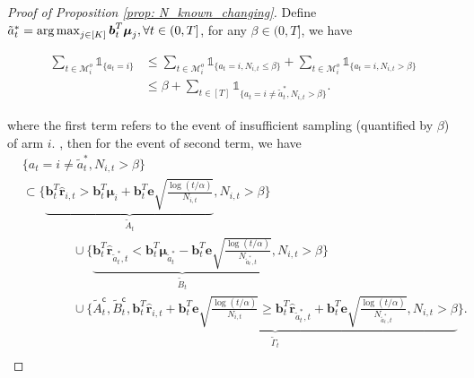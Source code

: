 \begin{proof}[Proof of Proposition \ref{prop: N_known_changing}]

Define $\tilde{a}_{t}^{*} = \operatorname*{arg\,max}_{j \in [K]} \boldsymbol{b}_t^T \boldsymbol{\mu}_j, \forall t \in (0,T]$, for any $\beta \in (0, T]$, we have

\begin{equation}
\begin{aligned}
\label{eq: term_1_stat}
\sum_{t \in \mathcal{M}^{o}_i} \mathds{1}_{\{a_t = i \} }
& \leq 
\sum_{t \in \mathcal{M}^{o}_i} \mathds{1}_{\{a_t = i, N_{i,t} \leq \beta \}}
+
\sum_{t \in \mathcal{M}^{o}_i} \mathds{1}_{\{a_t = i, N_{i,t} > \beta \}} \\
& \leq 
\beta
+
\sum_{t \in [T]} \mathds{1}_{\{a_t = i \neq \tilde{a}_{t}^{*}, N_{i,t} > \beta \}}.
\end{aligned}
\end{equation}



where the first term refers to the event of insufficient sampling (quantified by $\beta$) of arm $i$. 
, then for the event of second term, we have 
\begin{equation}
\begin{aligned}
\label{eq: event_ABC_t_stat1}
&{\{a_t = i \neq \tilde{a}_{t}^{*}, N_{i,t} > \beta \}} \\
& \subset
\Bigg\{ 
\underbrace{
\boldsymbol{b}_{t}^{T} \hat{\boldsymbol{r}}_{i,t} > \boldsymbol{b}_{t}^{T} \boldsymbol{\mu}_{i} + \boldsymbol{b}_{t}^{T} \boldsymbol{e} \sqrt{\frac{ \log(t/\alpha)}{N_{i,t}}}
}_{\tilde{A}_t}, 
N_{i,t} > \beta \Bigg\} \\
& \qquad \qquad \cup
\Bigg\{ 
\underbrace{
\boldsymbol{b}_{t}^{T} \hat{\boldsymbol{r}}_{\tilde{a}_{t}^{*},t} < \boldsymbol{b}_{t}^{T} \boldsymbol{\mu}_{\tilde{a}_{t}^{*}} - \boldsymbol{b}_{t}^{T} \boldsymbol{e} \sqrt{\frac{ \log(t/\alpha)}{N_{\tilde{a}_{t}^{*},t}}}
}_{\tilde{B}_t}, 
N_{i,t} > \beta \Bigg\} \\
& \qquad \qquad \cup
\Bigg\{ 
\underbrace{
\tilde{A}_t^{\mathsf{c}}, \tilde{B}_t^{\mathsf{c}}, 
\boldsymbol{b}_{t}^{T} \hat{\boldsymbol{r}}_{i,t} + \boldsymbol{b}_{t}^{T} \boldsymbol{e} \sqrt{\frac{ \log(t/\alpha)}{N_{i,t}}} 
\geq
\boldsymbol{b}_{t}^{T} \hat{\boldsymbol{r}}_{\tilde{a}_{t}^{*},t} + \boldsymbol{b}_{t}^{T} \boldsymbol{e} \sqrt{\frac{ \log(t/\alpha)}{N_{\tilde{a}_{t}^{*},t}}} , N_{i,t} > \beta }_{\tilde{\Gamma}_t} \Bigg\}.  \\
\end{aligned}
\end{equation}


\end{proof}
